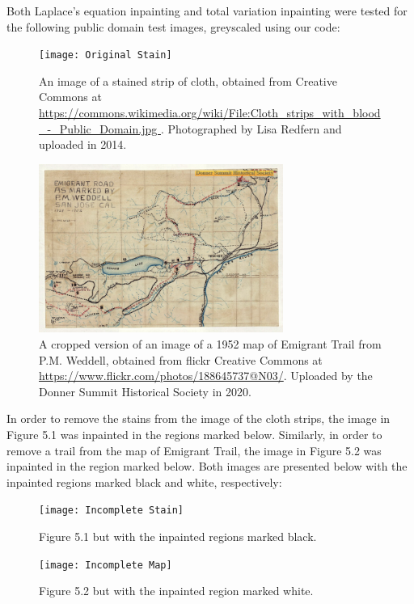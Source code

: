 \documentclass[11pt,reqno,twoside]{amsart}
\theoremstyle{plain}
\theoremstyle{definition}
\numberwithin{figure}{section}
\numberwithin{equation}{section}
\begin{document}
Both Laplace's equation inpainting and total variation inpainting were tested for the following public domain test images, greyscaled using our code:

\begin{center}
\begin{figure}[h]
\caption{An image of a stained strip of cloth, obtained from Creative Commons at \url{https://commons.wikimedia.org/wiki/File:Cloth_strips_with_blood_-_Public_Domain.jpg }.  Photographed by Lisa Redfern and uploaded in 2014.}
\vskip 1mm
\texttt{[image: Original Stain]}
\end{figure}
\end{center}
\begin{center}
\begin{figure}[h]
\caption{A cropped version of an image of a 1952 map of Emigrant Trail from P.M. Weddell, obtained from flickr Creative Commons at \url{https://www.flickr.com/photos/188645737@N03/}. Uploaded by the Donner Summit Historical Society in 2020.}
\vskip 1mm
\includegraphics[width = 8cm]{Original Map}
\end{figure}
\end{center}

\newpage

In order to remove the stains from the image of the cloth strips, the image in Figure 5.1 was inpainted in the regions marked below.  Similarly, in order to remove a trail from the map of Emigrant Trail, the image in Figure 5.2 was inpainted in the region marked below.  Both images are presented below with the inpainted regions marked black and white, respectively:

\begin{center}
\begin{figure}[h]
\caption{Figure 5.1 but with the inpainted regions marked black.}
\vskip 1mm
\texttt{[image: Incomplete Stain]}
\end{figure}
\end{center}
\begin{center}
\begin{figure}[h]
\caption{Figure 5.2 but with the inpainted region marked white.}
\vskip 1mm
\texttt{[image: Incomplete Map]}
\end{figure}
\end{center}
\end{document}
